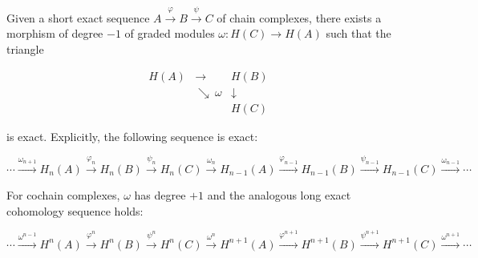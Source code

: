 Given a short exact sequence $A \xrightarrow{\varphi} B \xrightarrow{\psi} C$ of chain complexes, there exists a morphism of degree $-1$ of graded modules $\omega : H(C) \to H(A)$ such that the triangle

\[
\begin{array}{ccc}
H(A) & \longrightarrow & H(B) \\
& \searrow\ \omega & \downarrow \\
& & H(C)
\end{array}
\]

is exact. Explicitly, the following sequence is exact:

\[
\cdots \xrightarrow{\omega_{n+1}} H_n(A) \xrightarrow{\varphi_n} H_n(B) \xrightarrow{\psi_n} H_n(C) \xrightarrow{\omega_n} H_{n-1}(A) \xrightarrow{\varphi_{n-1}} H_{n-1}(B) \xrightarrow{\psi_{n-1}} H_{n-1}(C) \xrightarrow{\omega_{n-1}} \cdots
\]

For cochain complexes, $\omega$ has degree $+1$ and the analogous long exact cohomology sequence holds:

\[
\cdots \xrightarrow{\omega^{n-1}} H^n(A) \xrightarrow{\varphi^n} H^n(B) \xrightarrow{\psi^n} H^n(C) \xrightarrow{\omega^n} H^{n+1}(A) \xrightarrow{\varphi^{n+1}} H^{n+1}(B) \xrightarrow{\psi^{n+1}} H^{n+1}(C) \xrightarrow{\omega^{n+1}} \cdots
\]
